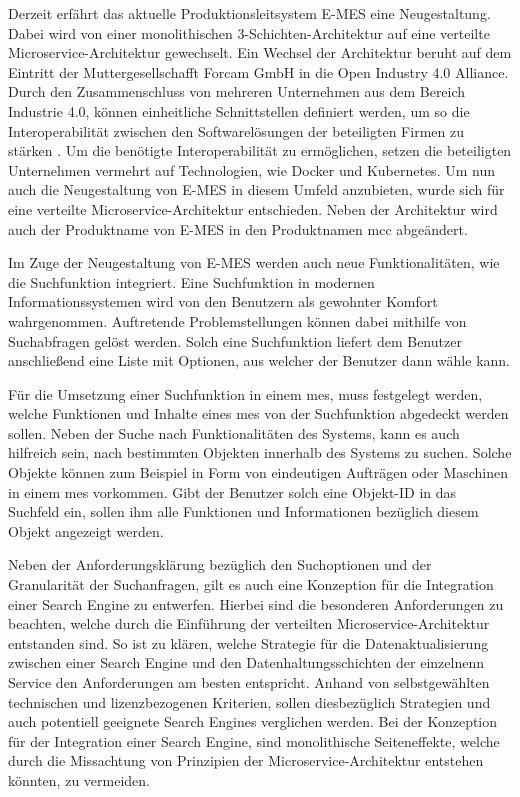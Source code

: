 Derzeit erfährt das aktuelle Produktionsleitsystem E-MES eine Neugestaltung. Dabei wird von einer monolithischen 3-Schichten-Architektur auf eine verteilte Microservice-Architektur gewechselt. Ein Wechsel der Architektur beruht auf dem Eintritt der Muttergesellschafft Forcam GmbH in die \glqq Open Industry 4.0 Alliance\grqq{}. Durch den Zusammenschluss von mehreren Unternehmen aus dem Bereich \glqq Industrie 4.0\grqq{}, können einheitliche Schnittstellen definiert werden, um so die Interoperabilität zwischen den Softwarelösungen der beteiligten Firmen zu stärken \cite{OpenIndustry4.0Alliance.2021}. Um die benötigte Interoperabilität zu ermöglichen, setzen die beteiligten Unternehmen vermehrt auf Technologien, wie Docker und Kubernetes. Um nun auch die Neugestaltung von E-MES in diesem Umfeld anzubieten, wurde sich für eine verteilte Microservice-Architektur entschieden. Neben der Architektur wird auch der Produktname von \glqq E-MES\grqq{} in den Produktnamen \glqq \gls{mcc}\grqq{} abgeändert. 

Im Zuge der Neugestaltung von E-MES werden auch neue Funktionalitäten, wie die Suchfunktion integriert. Eine Suchfunktion in modernen Informationssystemen wird von den Benutzern als gewohnter Komfort wahrgenommen. Auftretende Problemstellungen können dabei mithilfe von Suchabfragen gelöst werden. Solch eine Suchfunktion liefert dem Benutzer anschließend eine Liste mit Optionen, aus welcher der Benutzer dann wähle kann.

Für die Umsetzung einer Suchfunktion in einem \gls{mes}, muss festgelegt werden, welche Funktionen und Inhalte eines \gls{mes} von der Suchfunktion abgedeckt werden sollen. Neben der Suche nach Funktionalitäten des Systems, kann es auch hilfreich sein, nach bestimmten \glqq Objekten\grqq{} innerhalb des Systems zu suchen. Solche Objekte können zum Beispiel in Form von eindeutigen Aufträgen oder Maschinen in einem \gls{mes} vorkommen. Gibt der Benutzer solch eine Objekt-ID in das Suchfeld ein, sollen ihm alle Funktionen und Informationen bezüglich diesem Objekt angezeigt werden.

Neben der Anforderungsklärung bezüglich den Suchoptionen und der Granularität der Suchanfragen, gilt es auch eine Konzeption für die Integration einer Search Engine zu entwerfen. Hierbei sind die besonderen Anforderungen zu beachten, welche durch die Einführung der verteilten Microservice-Architektur entstanden sind. So ist zu klären, welche Strategie für die Datenaktualisierung zwischen einer Search Engine und den Datenhaltungsschichten der einzelnenn Service den Anforderungen am besten entspricht. Anhand von selbstgewählten technischen und lizenzbezogenen Kriterien, sollen diesbezüglich Strategien und auch potentiell geeignete Search Engines verglichen werden. Bei der Konzeption für der Integration einer Search Engine, sind monolithische Seiteneffekte, welche durch die Missachtung von Prinzipien der Microservice-Architektur entstehen könnten, zu vermeiden.

